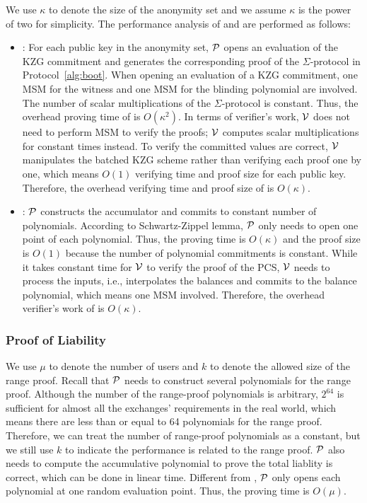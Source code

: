 We use $\kappa$ to denote the size of the anonymity set and we assume $\kappa$ is the power of two for simplicity. The performance analysis of \bootstrap and \userproof are performed as follows:
\begin{itemize}

\item \bootstrap: For each public key in the anonymity set, $\mathcal{P}$ opens an evaluation of the KZG commitment and generates the corresponding proof of the $\Sigma$-protocol in Protocol~\ref{alg:boot}. When opening an evaluation of a KZG commitment, one MSM for the witness and one MSM for the blinding polynomial are involved. The number of scalar multiplications of the $\Sigma$-protocol is constant. Thus, the overhead proving time of \bootstrap is $O(\kappa^2)$. In terms of verifier's work, $\mathcal{V}$ does not need to perform MSM to verify the proofs; $\mathcal{V}$ computes scalar multiplications for constant times instead. To verify the committed values are correct, $\mathcal{V}$ manipulates the batched KZG scheme rather than verifying each proof one by one, which means $O(1)$ verifying time and proof size for each public key. Therefore, the overhead verifying time and proof size of \bootstrap is $O(\kappa)$.

\item \poa: $\mathcal{P}$ constructs the accumulator and commits to constant number of polynomials. According to Schwartz-Zippel lemma, $\mathcal{P}$ only needs to open one point of each polynomial. Thus, the proving time is $O(\kappa)$ and the proof size is $O(1)$ because the number of polynomial commitments is constant. While it takes constant time for $\mathcal{V}$ to verify the proof of the PCS, $\mathcal{V}$ needs to process the inputs, i.e., interpolates the balances and commits to the balance polynomial, which means one MSM involved. Therefore, the overhead verifier's work of \poa is $O(\kappa)$.

\end{itemize}

\subsubsection{Proof of Liability}
We use $\mu$ to denote the number of users and $k$ to denote the allowed size of the range proof. Recall that $\mathcal{P}$ needs to construct several polynomials for the range proof. Although the number of the range-proof polynomials is arbitrary, $2^{64}$ is sufficient for almost all the exchanges' requirements in the real world, which means there are less than or equal to 64 polynomials for the range proof. Therefore, we can treat the number of range-proof polynomials as a constant, but we still use $k$ to indicate the performance is related to the range proof. $\mathcal{P}$ also needs to compute the accumulative polynomial to prove the total liablity is correct, which can be done in linear time. Different from \bootstrap, $\mathcal{P}$ only opens each polynomial at one random evaluation point. Thus, the proving time is $O(\mu)$.

